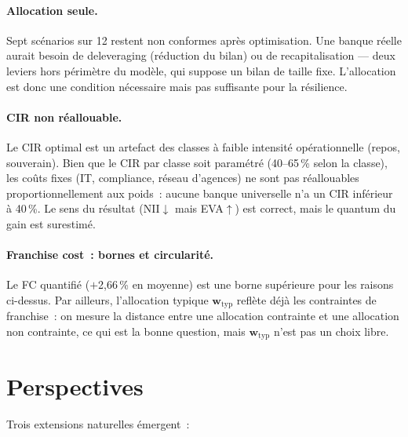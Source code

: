 \documentclass[10pt, a4paper, oneside]{report}
\theoremstyle{definition}
\begin{document}
\paragraph{Allocation seule.} Sept scénarios sur 12 restent non conformes après optimisation. Une banque réelle aurait besoin de deleveraging (réduction du bilan) ou de recapitalisation --- deux leviers hors périmètre du modèle, qui suppose un bilan de taille fixe. L'allocation est donc une condition nécessaire mais pas suffisante pour la résilience.

\paragraph{CIR non réallouable.} Le CIR optimal est un artefact des classes à faible intensité opérationnelle (repos, souverain). Bien que le CIR par classe soit paramétré (40--65\,\% selon la classe), les coûts fixes (IT, compliance, réseau d'agences) ne sont pas réallouables proportionnellement aux poids~: aucune banque universelle n'a un CIR inférieur à 40\,\%. Le sens du résultat (NII$\downarrow$ mais EVA$\uparrow$) est correct, mais le quantum du gain est surestimé.

\paragraph{Franchise cost~: bornes et circularité.} Le FC quantifié ($+$2{,}66\,\% en moyenne) est une borne supérieure pour les raisons ci-dessus. Par ailleurs, l'allocation typique $\mathbf{w}_{\text{typ}}$ reflète déjà les contraintes de franchise~: on mesure la distance entre une allocation contrainte et une allocation non contrainte, ce qui est la bonne question, mais $\mathbf{w}_{\text{typ}}$ n'est pas un choix libre.

\section*{Perspectives}
\label{sec:perspectives}

Trois extensions naturelles émergent~:
\end{document}
